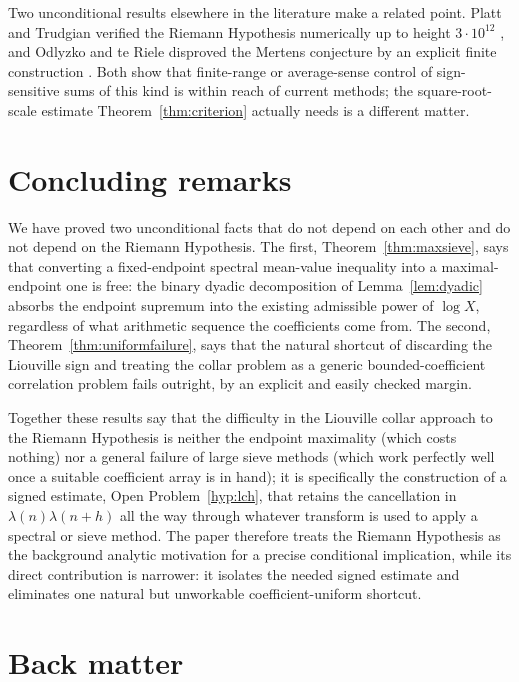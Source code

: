 \documentclass[11pt]{article}
\begin{document}
Two unconditional results elsewhere in the literature make a related point. Platt and Trudgian verified
the Riemann Hypothesis numerically up to height $3\cdot10^{12}$ \cite{platt-trudgian}, and Odlyzko and te
Riele disproved the Mertens conjecture by an explicit finite construction \cite{odlyzko-teriele}. Both show
that finite-range or average-sense control of sign-sensitive sums of this kind is within reach of current
methods; the square-root-scale estimate Theorem~\ref{thm:criterion} actually needs is a different matter.

\section{Concluding remarks}

We have proved two unconditional facts that do not depend on each other and do not depend on the Riemann
Hypothesis. The first, Theorem~\ref{thm:maxsieve}, says that converting a fixed-endpoint spectral mean-value
inequality into a maximal-endpoint one is free: the binary dyadic decomposition of
Lemma~\ref{lem:dyadic} absorbs the endpoint supremum into the existing admissible power of $\log X$,
regardless of what arithmetic sequence the coefficients come from. The second, Theorem~\ref{thm:uniformfailure},
says that the natural shortcut of discarding the Liouville sign and treating the collar problem as a
generic bounded-coefficient correlation problem fails outright, by an explicit and easily checked margin.

Together these results say that the difficulty in the Liouville collar approach to the Riemann Hypothesis
is neither the endpoint maximality (which costs nothing) nor a general failure of large sieve methods
(which work perfectly well once a suitable coefficient array is in hand); it is specifically the
construction of a signed estimate, Open Problem~\ref{hyp:lch}, that retains the cancellation in
$\lambda(n)\lambda(n+h)$ all the way through whatever transform is used to apply a spectral or sieve
method. The paper therefore treats the Riemann Hypothesis as the background analytic motivation for a
precise conditional implication, while its direct contribution is narrower: it isolates the needed signed
estimate and eliminates one natural but unworkable coefficient-uniform shortcut.

\section*{Back matter}
\end{document}
